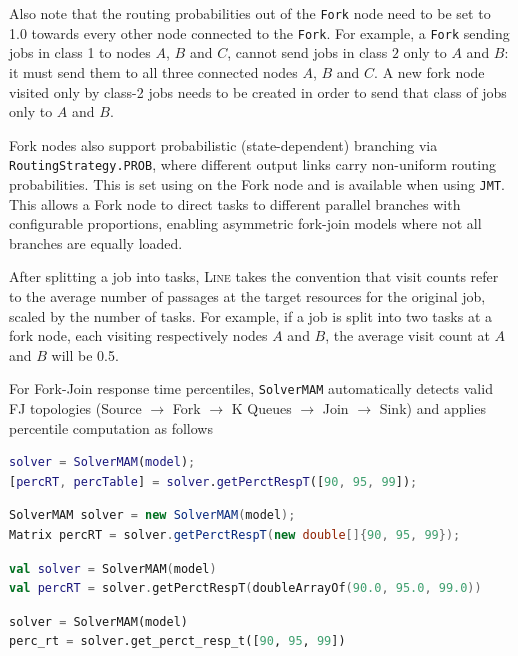 Also note that the routing probabilities out of the \texttt{Fork} node need to be set to 1.0 towards every other node connected to the \texttt{Fork}. For example, a \texttt{Fork} sending jobs in class 1 to nodes $A$, $B$ and $C$, cannot send jobs in class $2$ only to $A$ and $B$: it must send them to all three connected nodes $A$, $B$ and $C$. A new fork node visited only by class-2 jobs needs to be created in order to send that class of jobs only to $A$ and $B$.

Fork nodes also support probabilistic (state-dependent) branching via \texttt{RoutingStrategy.PROB}, where different output links carry non-uniform routing probabilities. This is set using  on the Fork node and is available when using \texttt{JMT}. This allows a Fork node to direct tasks to different parallel branches with configurable proportions, enabling asymmetric fork-join models where not all branches are equally loaded.

After splitting a job into tasks, \textsc{Line} takes the convention that visit counts refer to the average number of passages at the target resources for the original job, scaled by the number of tasks. For example, if a job is split into two tasks at a fork node, each visiting respectively nodes $A$ and $B$, the average visit count at $A$ and $B$ will be 0.5.

For Fork-Join response time percentiles, \texttt{SolverMAM} automatically detects valid FJ topologies (Source $\rightarrow$ Fork $\rightarrow$ K Queues $\rightarrow$ Join $\rightarrow$ Sink) and applies percentile computation as follows %
\begin{MATLAB}
\begin{lstlisting}[language = matlab]
solver = SolverMAM(model);
[percRT, percTable] = solver.getPerctRespT([90, 95, 99]);
\end{lstlisting}
\end{MATLAB}
\begin{JAVA}
\begin{lstlisting}[language = java, basicstyle=\ttfamily\scriptsize]
SolverMAM solver = new SolverMAM(model);
Matrix percRT = solver.getPerctRespT(new double[]{90, 95, 99});
\end{lstlisting}
\end{JAVA}
\begin{KOTLIN}
\begin{lstlisting}[language = kotlin, basicstyle=\ttfamily\scriptsize]
val solver = SolverMAM(model)
val percRT = solver.getPerctRespT(doubleArrayOf(90.0, 95.0, 99.0))
\end{lstlisting}
\end{KOTLIN}
\begin{PYTHON}
\begin{lstlisting}[language = python]
solver = SolverMAM(model)
perc_rt = solver.get_perct_resp_t([90, 95, 99])
\end{lstlisting}
\end{PYTHON}

